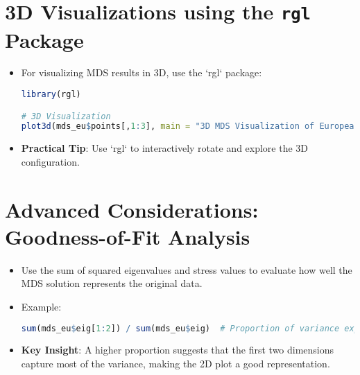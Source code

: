 \documentclass{article}
\begin{document}
\section{3D Visualizations using the \texttt{rgl} Package}
\begin{itemize}
    \item For visualizing MDS results in 3D, use the `rgl` package:
\begin{lstlisting}[language=R, breaklines=true]
library(rgl)

# 3D Visualization
plot3d(mds_eu$points[,1:3], main = "3D MDS Visualization of European Cities")
\end{lstlisting}
\item \textbf{Practical Tip}: Use `rgl` to interactively rotate and explore the 3D configuration.
\end{itemize}

\section{Advanced Considerations: Goodness-of-Fit Analysis}
\begin{itemize}
    \item Use the sum of squared eigenvalues and stress values to evaluate how well the MDS solution represents the original data.
    \item Example:
\begin{lstlisting}[language=R, breaklines=true]
sum(mds_eu$eig[1:2]) / sum(mds_eu$eig)  # Proportion of variance explained by first 2 dimensions
\end{lstlisting}
\item \textbf{Key Insight}: A higher proportion suggests that the first two dimensions capture most of the variance, making the 2D plot a good representation.
\end{itemize}
\end{document}
